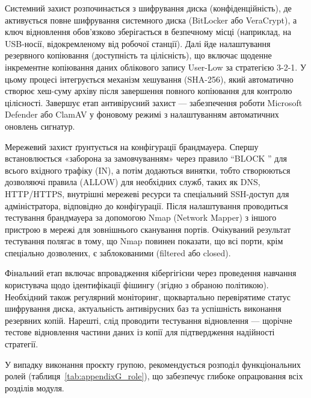 Системний захист розпочинається з шифрування диска (конфіденційність), де активується повне шифрування системного диска (BitLocker або VeraCrypt), а ключ відновлення обов'язково зберігається в безпечному місці (наприклад, на USB-носії, відокремленому від робочої станції). Далі йде налаштування резервного копіювання (доступність та цілісність), що включає щоденне інкрементне копіювання даних облікового запису User-Low за стратегією 3-2-1. У цьому процесі інтегрується механізм хешування (SHA-256), який автоматично створює хеш-суму архіву після завершення повного копіювання для контролю цілісності. Завершує етап антивірусний захист — забезпечення роботи Microsoft Defender або ClamAV у фоновому режимі з налаштуванням автоматичних оновлень сигнатур.

Мережевий захист ґрунтується на конфігурації брандмауера. Спершу встановлюється «заборона за замовчуванням» через правило ``BLOCK '' для всього вхідного трафіку (IN), а потім додаються винятки, тобто створюються дозволяючі правила (ALLOW) для необхідних служб, таких як DNS, HTTP/HTTPS, внутрішні мережеві ресурси та спеціальний SSH-доступ для адміністратора, відповідно до конфігурації. Після налаштування проводиться тестування брандмауера за допомогою Nmap (Network Mapper) з іншого пристрою в мережі для зовнішнього сканування портів. Очікуваний результат тестування полягає в тому, що Nmap повинен показати, що всі порти, крім спеціально дозволених, є заблокованими (filtered або closed).

Фінальний етап включає впровадження кібергігієни через проведення навчання користувача щодо ідентифікації фішингу (згідно з обраною політикою). Необхідний також регулярний моніторинг, щоквартально перевірятиме статус шифрування диска, актуальність антивірусних баз та успішність виконання резервних копій. Нарешті, слід проводити тестування відновлення — щорічне тестове відновлення частини даних із копії для підтвердження надійності стратегії.

У випадку виконання проєкту групою, рекомендується розподіл функціональних ролей (таблиця~\ref{tab:appendixG_role}), що забезпечує глибоке опрацювання всіх розділів модуля.

